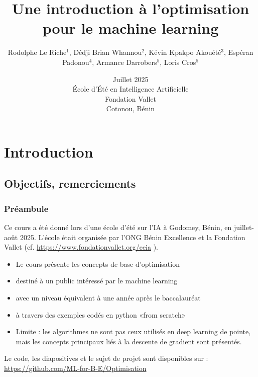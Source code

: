 \documentclass[12pt]{beamer}
\begin{document}
\title
[~Optimisation pour l'apprentissage automatique]
{Une introduction à l'optimisation pour le machine learning}
\author
[Le Riche et al.]
{\normalsize Rodolphe Le Riche$^1$, Dédji Brian Whannou$^2$, Kévin Kpakpo Akouété$^3$, Espéran Padonou$^4$, Armance Darrobers$^5$, Loris Cros$^5$} 
\date[Juillet 2025]{Juillet 2025 \\
École d'Été en Intelligence Artificielle \\
Fondation Vallet \\
Cotonou, Bénin} 
\begin{frame}
\titlepage
\end{frame}

\section{Introduction}
\subsection{Objectifs, remerciements}

\begin{frame}
\frametitle{Préambule}
Ce cours a été donné lors d'une école d'été sur l'IA à Godomey, Bénin, en juillet-août 2025.  
L'école était organisée par l'ONG Bénin Excellence et la Fondation Vallet (cf. 
{\scriptsize
\url{https://www.fondationvallet.org/eeia}}
).
\begin{itemize}
\item Le cours présente les concepts de base d'optimisation
\item destiné à un public intéressé par le machine learning
\item avec un niveau équivalent à une année après le baccalauréat
\item à travers des exemples codés en python «from scratch»
\item Limite : les algorithmes ne sont pas ceux utilisés en deep learning de pointe, mais les concepts principaux liés à la descente de gradient sont présentés.
\end{itemize}
Le code, les diapositives et le sujet de projet sont disponibles sur : {\scriptsize \url{https://github.com/ML-for-B-E/Optimisation}}
\end{frame}
\end{document}
